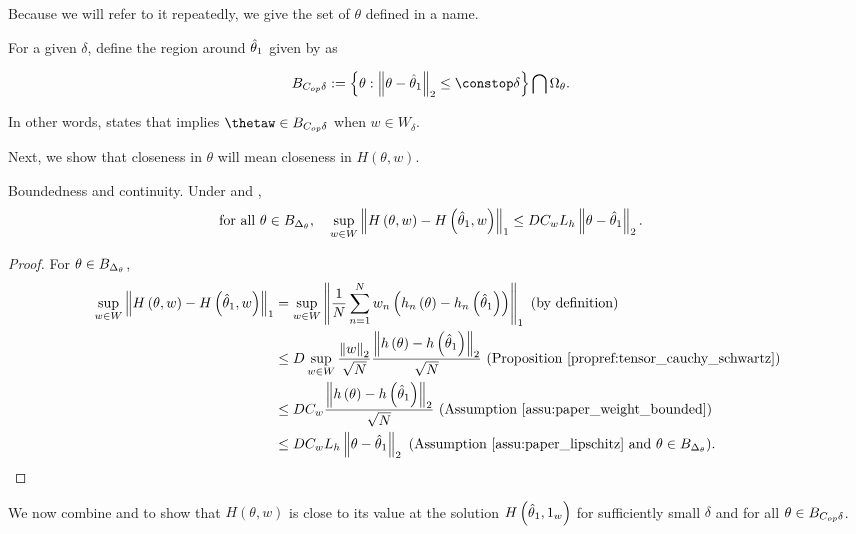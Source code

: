 %
Because we will refer to it repeatedly, we give the set of $\theta$
defined in  a name.
%
\begin{defn}
For a given $\delta$, define the region around $\hat{\theta}_{1}$ given
by  as

\begin{align*}
\thetadeltaball & :=\left\{ \theta:\norm{\theta-\thetaone}_{2}\le\constop\delta\right\} \bigcap\Omega_{\theta}.
\end{align*}
\end{defn}
%
%
In other words,  states that 
implies $\thetaw\in\thetadeltaball$ when $w\in W_{\delta}$.

Next, we show that closeness in $\theta$ will mean closeness in $H\left(\theta,w\right)$.
\begin{lem}
\label{lem:bounded_continuous} Boundedness and continuity. Under
\paperallcoreassum and ,
\begin{align*}
\textrm{for all }\theta\in B_{\Delta_{\theta}},\quad\sup_{w\in W}\left\Vert H\left(\theta,w\right)-H\left(\hat{\theta}_{1},w\right)\right\Vert_{1} & \le DC_{w}L_{h}\left\Vert \theta-\hat{\theta}_{1}\right\Vert_{2}.
\end{align*}
\end{lem}
\begin{proof}
For $\theta\in B_{\Delta_{\theta}}$,
\begin{align*}
\sup_{w\in W}\left\Vert H\left(\theta,w\right)-H\left(\hat{\theta}_{1},w\right)\right\Vert_{1} & =\sup_{w\in W}\left\Vert \frac{1}{N}\sum_{n=1}^{N}w_{n}\left(h_{n}\left(\theta\right)-h_{n}\left(\hat{\theta}_{1}\right)\right)\right\Vert_{1}\textrm{ (by definition)}\\
 & \le D\sup_{w\in W}\frac{\left\Vert w\right\Vert_{2}}{\sqrt{N}}\frac{\left\Vert h\left(\theta\right)-h\left(\hat{\theta}_{1}\right)\right\Vert_{2}}{\sqrt{N}}\textrm{ (Proposition \ref{propref:tensor_cauchy_schwartz})}\\
 & \le DC_{w}\frac{\left\Vert h\left(\theta\right)-h\left(\hat{\theta}_{1}\right)\right\Vert_{2}}{\sqrt{N}}\textrm{ (Assumption \ref{assu:paper_weight_bounded})}\\
 & \le DC_{w}L_{h}\left\Vert \theta-\hat{\theta}_{1}\right\Vert_{2}\textrm{ (Assumption \ref{assu:paper_lipschitz} and }\theta\in B_{\Delta_{\theta}}\textrm{)}.
\end{align*}
\end{proof}
%
We now combine  and 
to show that $H\left(\theta,w\right)$ is close to its value at the
solution $H\left(\hat{\theta}_{1},1_{w}\right)$ for sufficiently small
$\delta$ and for all $\theta\in B_{C_{op}\delta}$.
%


